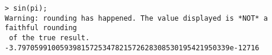 \begin{center}\begin{minipage}{15cm}\begin{Verbatim}[frame=single]
> sin(pi);
Warning: rounding has happened. The value displayed is *NOT* a faithful rounding
 of the true result.
-3.79705991005939815725347821572628308530195421950339e-12716
\end{Verbatim}
\end{minipage}\end{center}
